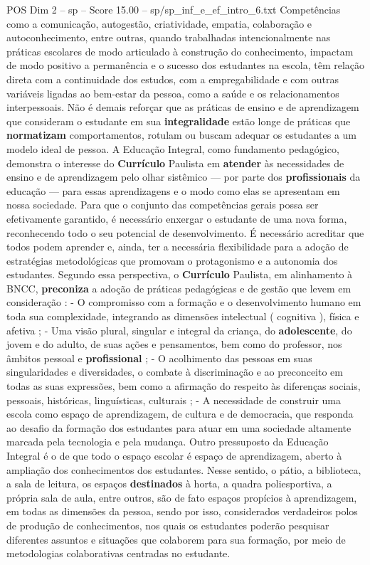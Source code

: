 \begin{textsample}{POS Dim 2 – sp – Score 15.00 – sp/sp\_inf\_e\_ef\_intro\_6.txt}
Competências como a comunicação, autogestão, criatividade, empatia, colaboração e autoconhecimento, entre outras, quando trabalhadas intencionalmente nas práticas escolares de modo articulado à construção do conhecimento, impactam de modo positivo a permanência e o sucesso dos estudantes na escola, têm relação direta com a continuidade dos estudos, com a empregabilidade e com outras variáveis ligadas ao bem-estar da pessoa, como a saúde e os relacionamentos interpessoais.
Não é demais reforçar que as práticas de ensino e de aprendizagem que consideram o estudante em sua \textbf{integralidade} estão longe de práticas que \textbf{normatizam} comportamentos, rotulam ou buscam adequar os estudantes a um modelo ideal de pessoa.
A Educação Integral, como fundamento pedagógico, demonstra o interesse do \textbf{Currículo} Paulista em \textbf{atender} às necessidades de ensino e de aprendizagem pelo olhar sistêmico — por parte dos \textbf{profissionais} da educação — para essas aprendizagens e o modo como elas se apresentam em nossa sociedade.
Para que o conjunto das competências gerais possa ser efetivamente garantido, é necessário enxergar o estudante de uma nova forma, reconhecendo todo o seu potencial de desenvolvimento.
É necessário acreditar que todos podem aprender e, ainda, ter a necessária flexibilidade para a adoção de estratégias metodológicas que promovam o protagonismo e a autonomia dos estudantes.
Segundo essa perspectiva, o \textbf{Currículo} Paulista, em alinhamento à BNCC, \textbf{preconiza} a adoção de práticas pedagógicas e de gestão que levem em consideração : - O compromisso com a formação e o desenvolvimento humano em toda sua complexidade, integrando as dimensões intelectual ( cognitiva ), física e afetiva ; - Uma visão plural, singular e integral da criança, do \textbf{adolescente}, do jovem e do adulto, de suas ações e pensamentos, bem como do professor, nos âmbitos pessoal e \textbf{profissional} ; - O acolhimento das pessoas em suas singularidades e diversidades, o combate à discriminação e ao preconceito em todas as suas expressões, bem como a afirmação do respeito às diferenças sociais, pessoais, históricas, linguísticas, culturais ; - A necessidade de construir uma escola como espaço de aprendizagem, de cultura e de democracia, que responda ao desafio da formação dos estudantes para atuar em uma sociedade altamente marcada pela tecnologia e pela mudança.
Outro pressuposto da Educação Integral é o de que todo o espaço escolar é espaço de aprendizagem, aberto à ampliação dos conhecimentos dos estudantes.
Nesse sentido, o pátio, a biblioteca, a sala de leitura, os espaços \textbf{destinados} à horta, a quadra poliesportiva, a própria sala de aula, entre outros, são de fato espaços propícios à aprendizagem, em todas as dimensões da pessoa, sendo por isso, considerados verdadeiros polos de produção de conhecimentos, nos quais os estudantes poderão pesquisar diferentes assuntos e situações que colaborem para sua formação, por meio de metodologias colaborativas centradas no estudante.

\end{textsample}
